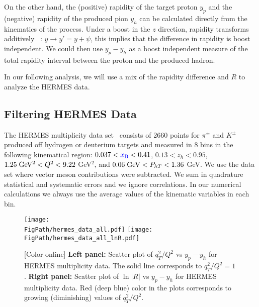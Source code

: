\documentclass[final,3p,times,onecolumn,sort&compress,hidelinks]{elsarticle}
\newcommand{\xbj}{\ensuremath{{\cbl x_{\rm B}}}}
\newcommand\3[1]{\boldsymbol{#1}}
\newcommand{\cbl}{\color{blue}}
\newcommand*{\FigPath}{../Figs/}%
\begin{document}
{On the other hand, the (positive) rapidity of the target proton $y_p$ and the (negative) rapidity of the produced pion $y_h$ can be calculated directly from the kinematics of the process. 
 Under a boost in the  $z$ direction, rapidity transforms additively ~\cite{Collins:2011zzd}: $y \to y' = y+\psi$, this implies that the difference in rapidity is boost independent.
We could then use $y_p - y_h$ as a boost independent measure of the total rapidity interval between the proton and the produced hadron.

In our following analysis, we will use a mix of the rapidity difference and $R$ to analyze the HERMES data.}

\subsection{Filtering HERMES Data} 

The HERMES multiplicity data set~\cite{Airapetian:2012ki} consists of 2660 points for $\pi^\pm$ and $K^\pm$ produced off hydrogen or deuterium targets and measured in 8 bins in the following kinematical region: $0.037 < \xbj < 0.41$, $0.13 < z_h < 0.95$, $1.25\; {\rm GeV^2} < Q^2 < 9.22$ GeV$^2$,  and $0.06 \; {\rm GeV} < P_{hT} < 1.36$ GeV. We use the data set where vector meson contributions were subtracted. We sum in quadrature statistical and systematic errors and we ignore correlations. In our numerical calculations we always use the average values of the kinematic variables in each bin.
\begin{figure}[htb!]
\centering
\texttt{[image: \\FigPath/hermes\_data\_all.pdf]}
\texttt{[image: \\FigPath/hermes\_data\_all\_lnR.pdf]}
\caption{\label{Fig:hermes_data_rapidity}
[Color online]  {\bf Left panel:} Scatter plot of $q_T^2/Q^2$ vs $y_p-y_h$ for HERMES multiplicity data.  The solid line corresponds to $q_T^2/Q^2=1$. {\bf Right panel:} Scatter plot of $\ln|R|$  vs $y_p-y_h$ for HERMES multiplicity data. Red (deep blue) color in the plots corresponds to growing (diminishing) values of $q_T^2/Q^2$.
}
\end{figure}
\end{document}
